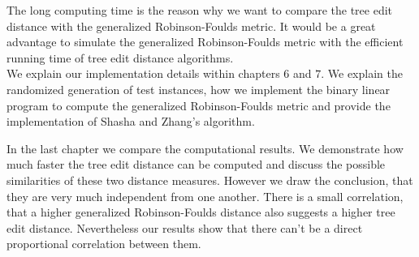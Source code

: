 The long computing time is the reason why we want to compare the tree edit distance with the generalized Robinson-Foulds metric. It would be a great advantage to simulate the generalized Robinson-Foulds metric with the efficient running time of tree edit distance algorithms. \\
We explain our implementation details within chapters $6$ and $7$. We explain the randomized generation of test instances, how we implement the binary linear program to compute the generalized Robinson-Foulds metric and provide the implementation of Shasha and Zhang's algorithm. 

In the last chapter we compare the computational results. We demonstrate how much faster the tree edit distance can be computed and discuss the possible similarities of these two distance measures. However we draw the conclusion, that they are very much independent from one another. There is a small correlation, that a higher generalized Robinson-Foulds distance also suggests a higher tree edit distance. Nevertheless our results show that there can't be a direct proportional correlation between them.